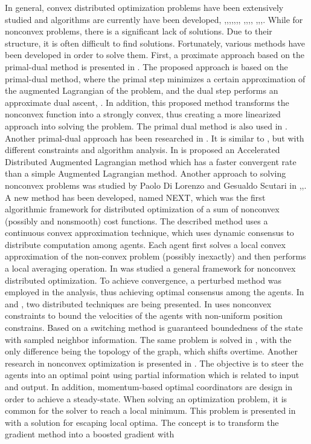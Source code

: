     In general, convex distributed optimization problems have been extensively studied and algorithms are currently have been developed, \cite{6358346},\cite{KIA2015254},\cite{10209260},\cite{DAI2020109256},\cite{SEMSARKAZEROONI20082766},\cite{GU20197548},\cite{QIU2016209}, \cite{8812749},\cite{FENG201612},\cite{YANG2018182},\cite{LIN2016120}, \cite{7500070},\cite{8899755},\cite{9316705},\cite{DOMINGUEZGARCIA201533}. While for nonconvex problems, there is a significant lack of solutions. Due to their structure, it is often difficult to find solutions. Fortunately, various methods have been developed in order to solve them. First, a proximate approach based on the primal-dual method is presented in \cite{pmlr-v70-hong17a}. The proposed approach is based on the primal-dual method, where the primal step minimizes a certain approximation of the augmented Lagrangian of the problem, and the dual step performs an approximate dual ascent, \cite{hong2016decomposing}. In addition, this proposed method transforms the nonconvex function into a strongly convex, thus creating a more linearized approach into solving the problem. The primal dual method is also used in \cite{LEI2016110}. Another primal-dual approach has been researched in \cite{7833143}. It is similar to \cite{pmlr-v70-hong17a}, but with different constraints and algorithm analysis. In \cite{7833143} is proposed an Accelerated Distributed Augmented Lagrangian method which has a faster convergent rate than a simple Augmented Lagrangian method. Another approach to solving nonconvex problems was studied by Paolo Di Lorenzo and Gesualdo Scutari in \cite{7398129},\cite{7383778},\cite{7869154}. A new method has been developed, named NEXT, which was the first algorithmic framework for distributed optimization of a sum of nonconvex (possibly and nonsmooth) cost functions. The described method uses a continuous convex approximation technique, which uses dynamic consensus to distribute computation among agents. Each agent first solves a local convex approximation of the non-convex problem (possibly inexactly) and then performs a local averaging operation. In \cite{7807315} was studied a general framework for nonconvex distributed optimization. To achieve convergence, a perturbed method was employed in the analysis, thus achieving optimal consensus among the agents. In \cite{8472181} and \cite{7776843}, two distributed techniques are being presented. In \cite{8472181} uses nonconvex constraints to bound the velocities of the agents with non-uniform position constrains. Based on a switching method is guaranteed boundedness of the state with sampled neighbor information. The same problem is solved in \cite{7776843}, with the only difference being the topology of the graph, which shifts overtime. Another research in nonconvex optimization is presented in \cite{9965620}. The objective is to steer the agents into an optimal point using partial information which is related to input and output. In addition, momentum-based optimal coordinators are design in order to achieve a steady-state. When solving an optimization problem, it is common for the solver to reach a local minimum. This problem is presented in \cite{9246278} with a solution for escaping local optima. The concept is to transform the gradient method into a boosted gradient with 
